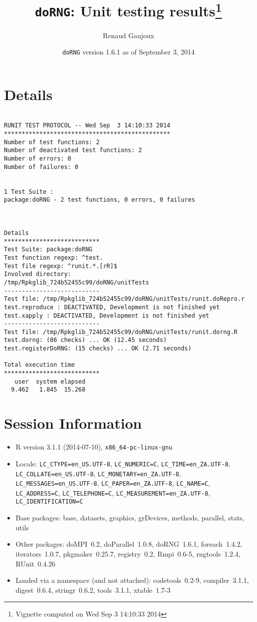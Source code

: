 \documentclass[10pt]{article}\usepackage[]{graphicx}\usepackage[]{color}
\author{Renaud Gaujoux}
\title{\texttt{doRNG}: Unit testing results\footnote{Vignette computed  on Wed Sep  3 14:10:33 2014}}
\date{\texttt{doRNG} version 1.6.1 as of September  3, 2014}
\begin{document}
\maketitle

\section{Details}
\begin{verbatim}

RUNIT TEST PROTOCOL -- Wed Sep  3 14:10:33 2014 
*********************************************** 
Number of test functions: 2 
Number of deactivated test functions: 2 
Number of errors: 0 
Number of failures: 0 

 
1 Test Suite : 
package:doRNG - 2 test functions, 0 errors, 0 failures



Details 
*************************** 
Test Suite: package:doRNG 
Test function regexp: ^test. 
Test file regexp: ^runit.*.[rR]$ 
Involved directory: 
/tmp/Rpkglib_724b52455c99/doRNG/unitTests 
--------------------------- 
Test file: /tmp/Rpkglib_724b52455c99/doRNG/unitTests/runit.doRepro.r 
test.reproduce : DEACTIVATED, Development is not finished yet
test.xapply : DEACTIVATED, Development is not finished yet
--------------------------- 
Test file: /tmp/Rpkglib_724b52455c99/doRNG/unitTests/runit.dorng.R 
test.dorng: (86 checks) ... OK (12.45 seconds)
test.registerDoRNG: (15 checks) ... OK (2.71 seconds)

Total execution time
***************************
   user  system elapsed 
  9.462   1.845  15.268 

\end{verbatim}

\section*{Session Information}
\begin{itemize}\raggedright
  \item R version 3.1.1 (2014-07-10), \verb|x86_64-pc-linux-gnu|
  \item Locale: \verb|LC_CTYPE=en_US.UTF-8|, \verb|LC_NUMERIC=C|, \verb|LC_TIME=en_ZA.UTF-8|, \verb|LC_COLLATE=en_US.UTF-8|, \verb|LC_MONETARY=en_ZA.UTF-8|, \verb|LC_MESSAGES=en_US.UTF-8|, \verb|LC_PAPER=en_ZA.UTF-8|, \verb|LC_NAME=C|, \verb|LC_ADDRESS=C|, \verb|LC_TELEPHONE=C|, \verb|LC_MEASUREMENT=en_ZA.UTF-8|, \verb|LC_IDENTIFICATION=C|
  \item Base packages: base, datasets, graphics, grDevices, methods,
    parallel, stats, utils
  \item Other packages: doMPI~0.2, doParallel~1.0.8, doRNG~1.6.1,
    foreach~1.4.2, iterators~1.0.7, pkgmaker~0.25.7, registry~0.2,
    Rmpi~0.6-5, rngtools~1.2.4, RUnit~0.4.26
  \item Loaded via a namespace (and not attached): codetools~0.2-9,
    compiler~3.1.1, digest~0.6.4, stringr~0.6.2, tools~3.1.1,
    xtable~1.7-3
\end{itemize}
\end{document}

